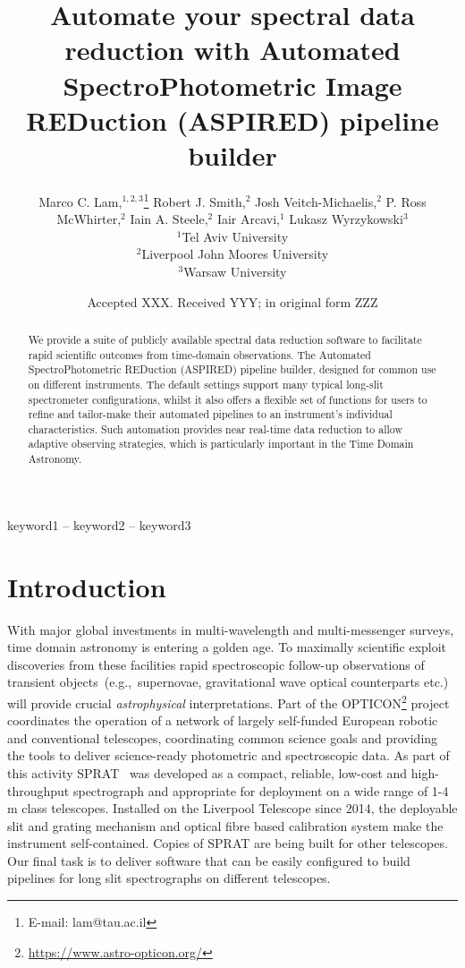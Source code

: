 \documentclass[fleqn,usenatbib]{mnras}
\title[ASPIRED]{Automate your spectral data reduction with Automated SpectroPhotometric Image REDuction (ASPIRED) pipeline builder}
\author[M. C. Lam et al.]{
Marco C. Lam,$^{1, 2, 3}$\thanks{E-mail: lam@tau.ac.il}
Robert J. Smith,$^{2}$
Josh Veitch-Michaelis,$^{2}$
P. Ross McWhirter,$^{2}$
Iain A. Steele,$^{2}$
\newauthor
Iair Arcavi,$^{1}$
Lukasz Wyrzykowski$^{3}$
\\
$^{1}$Tel Aviv University\\
$^{2}$Liverpool John Moores University\\
$^{3}$Warsaw University
}
\date{Accepted XXX. Received YYY; in original form ZZZ}
\begin{document}
\label{firstpage}
\pagerange{\pageref{firstpage}--\pageref{lastpage}}
\maketitle

\begin{abstract}
We provide a suite of publicly available spectral data reduction software
to facilitate rapid scientific outcomes from time-domain observations. The Automated
SpectroPhotometric REDuction (\textsc{ASPIRED}) pipeline builder, designed for common
use on different instruments. The default settings support many typical long-slit
spectrometer configurations, whilst it also offers a flexible set of functions for
users to refine and tailor-make their automated pipelines to an instrument's
individual characteristics. Such automation provides near real-time data reduction
to allow adaptive observing strategies, which is particularly important in the Time
Domain Astronomy.
\end{abstract}

\begin{keywords}
keyword1 -- keyword2 -- keyword3
\end{keywords}



\section{Introduction}
With major global investments in multi-wavelength and multi-messenger surveys, time domain
astronomy is entering a golden age. To maximally scientific exploit discoveries from these
facilities rapid spectroscopic follow-up observations of transient objects~(e.g.,\ supernovae,
gravitational wave optical counterparts etc.) will provide crucial {\em astrophysical} 
interpretations. Part of the OPTICON\footnote{\url{https://www.astro-opticon.org/}} project
coordinates the operation of a network of largely self-funded European robotic and conventional
telescopes, coordinating common science goals and providing the tools to deliver science-ready
photometric and spectroscopic data. As part of this activity SPRAT~\citep{2014SPIE.9147E..8HP}
was developed as a compact, reliable, low-cost and high-throughput spectrograph and appropriate
for deployment on a wide range of 1-4\,m class telescopes. Installed on the Liverpool Telescope
since 2014, the deployable slit and grating mechanism and optical fibre based calibration
system make the instrument self-contained. Copies of SPRAT are being built for other 
telescopes. Our final task is to deliver software that can be easily configured to build
pipelines for long slit spectrographs on different telescopes.
\end{document}
